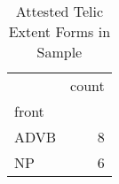 \begin{table}[htbp!]
\centering
\caption{Attested Telic Extent Forms in Sample}
\label{table:telic_phtype}
\begin{tabular}{lr}
\toprule
{} &  count \\
front &        \\
\midrule
ADVB  &      8 \\
NP    &      6 \\
\bottomrule
\end{tabular}
\end{table}
